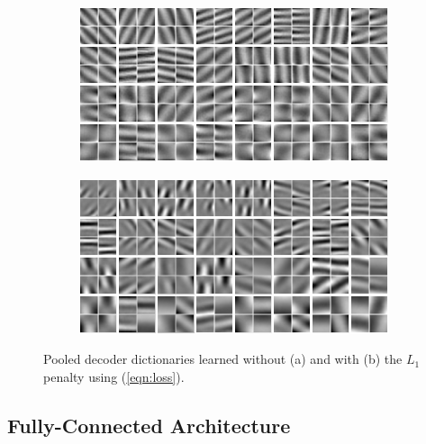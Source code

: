 \documentclass{article} %
\begin{document}
\begin{figure}
  \centering
  \begin{subfigure}[b]{0.45\textwidth}
        \includegraphics[width=\textwidth]{./Figures/slow_dec_pooling_sub.png}
        \caption{}
        \label{fig:pooldec}
  \end{subfigure}
  \begin{subfigure}[b]{0.45\textwidth}
        \includegraphics[width=\textwidth]{./Figures/slow_dec_l1_pooling.png}
        \caption{}
        \label{fig:pooll1dec}
  \end{subfigure}
  \caption{Pooled decoder dictionaries learned without (a) and with (b) the $L_1$ penalty using (\ref{eqn:loss}).}
  \label{fig:sfpool}
\end{figure}

\subsection{Fully-Connected Architecture}
\end{document}
